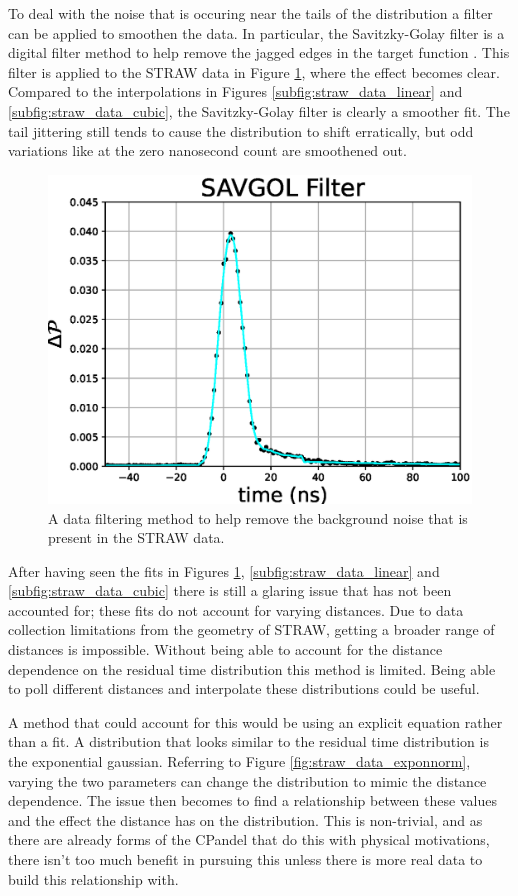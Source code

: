 To deal with the noise that is occuring near the tails of the distribution a filter can be applied to smoothen the data. In particular, the Savitzky-Golay filter is a digital filter method to help remove the jagged edges in the target function \cite{savgol}. This filter is applied to the STRAW data in Figure \ref{fig:straw_data_savgol}, where the effect becomes clear. Compared to the interpolations in Figures \ref{subfig:straw_data_linear} and \ref{subfig:straw_data_cubic}, the Savitzky-Golay filter is clearly a smoother fit. The tail jittering still tends to cause the distribution to shift erratically, but odd variations like at the zero nanosecond count are smoothened out.

\begin{figure}[H]
  \centering
  \includegraphics[width=12cm]{./Figures/reco_plots/straw_data_fit_savgol.eps}
  \caption{A data filtering method to help remove the background noise that is present in the STRAW data.}
  \label{fig:straw_data_savgol}
\end{figure}

After having seen the fits in Figures \ref{fig:straw_data_savgol}, \ref{subfig:straw_data_linear} and \ref{subfig:straw_data_cubic} there is still a glaring issue that has not been accounted for; these fits do not account for varying distances. Due to data collection limitations from the geometry of STRAW, getting a broader range of distances is impossible. Without being able to account for the distance dependence on the residual time distribution this method is limited. Being able to poll different distances and interpolate these distributions could be useful.

A method that could account for this would be using an explicit equation rather than a fit. A distribution that looks similar to the residual time distribution is the exponential gaussian. Referring to Figure \ref{fig:straw_data_exponnorm}, varying the two parameters can change the distribution to mimic the distance dependence. The issue then becomes to find a relationship between these values and the effect the distance has on the distribution. This is non-trivial, and as there are already forms of the CPandel that do this with physical motivations, there isn't too much benefit in pursuing this unless there is more real data to build this relationship with. 

